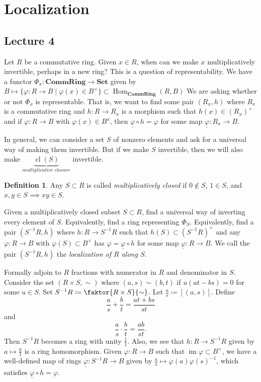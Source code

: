 \documentclass[10pt,letterpaper,cm]{nupset}
\theoremstyle{definition}
\newtheorem{definition}{Definition}[subsection]
\theoremstyle{theorem}
\theoremstyle{remark}
\newcommand{\1}{\mathbf{1}}
\newcommand{\0}{\vec 0}
\DeclareMathOperator{\im}{im}
\DeclareMathOperator{\cl}{cl}
\DeclareMathOperator{\Hom}{Hom}
\begin{document}
\section{Localization}

\subsection{Lecture 4}

Let $R$ be a commutative ring. Given $x\in R$, when can we make $x$ multiplicatively invertible, perhaps in a new ring? This is a question of representability. We have a functor $\Phi_x : \mathbf{CommRing} \to \mathbf{Set}$ given by $B \mapsto \{\varphi : R \to B \mid \varphi(x) \in B^{\times}\} \subset \Hom_{\mathbf{CommRing}}(R, B)$ We are asking whether or not $\Phi_x$ is representable. That is, we want to find some pair $(R_x, h)$ where $R_x$ is a commutative ring and $h: R \to R_x$ is a morphism such that $h(x) \in (R_x)^{\times}$ and if $\varphi : R \to B$ with $\varphi(x) \in B^x$, then $\underline{\varphi}  \circ h= \varphi$ for some map $\underline{\varphi} : R_x \to B$.

In general, we can consider a set $S$ of nonzero elements and ask for a universal way of making them invertible. But if we make $S$ invertible, then we will also make $\underbrace{\cl(S)}_{\textit{multiplicative closure}}$ invertible.

\begin{definition}
Any $S\subset R$ is called \textit{multiplicatively closed} if $0\notin S$, $1\in S$, and $x,y\in S \implies xy\in S$.
\end{definition}

Given a multiplicatively closed subset $S \subset R$, find a universal way of inverting every element of $S$. Equivalently, find a ring representing $\Phi_S$. Equivalently, find a pair $(S^{-1}R, h)$ where  $h: R\to S^{-1}R$ such that $h(S) \subset (S^{-1}R)^{\times}$ and any $\varphi : R \to B$ with $\varphi(S) \subset B^{\times}$ has $\varphi = \underline{\varphi} \circ h$ for some map $ \underline{\varphi} : R \to B$.  We call the pair $(S^{-1}R, h)$ the \textit{localization of $R$ along $S$}.

Formally adjoin to $R$ fractions with numerator in $R$ and denominator in $S$. Consider the set $(R \times S, \sim)$ where $(a, s) \sim (b,t)$ if $u(at-bs) =0$ for some $u\in S$. Set $S^{-1}R \coloneqq  \faktor{R\times S}{\sim}$. Let $\frac{a}{s} \coloneqq  [(a,s)]$. Define $$\frac{a}{s} + \frac{b}{t} = \frac{at+bs}{st}$$ and $$\frac{a}{s}\cdot \frac{b}{t} = \frac{ab}{st}.$$ Then $S^{-1}R$ becomes a ring with unity $\frac{1}{1}$. Also, we see that $h: R \to S^{-1}R$ given by $a\mapsto \frac{a}{1}$ is a ring homomorphism. Given $\varphi: R \to B$ such that $\im{\varphi} \subset B^{\times}$, we have a well-defined map of rings $\underline{\varphi} : S^{-1}R \to B$ given by $\frac{a}{s} \mapsto \varphi(a) \varphi(s)^{-1}$, which satisfies $\underline{\varphi} \circ h = \varphi$. 
\end{document}

